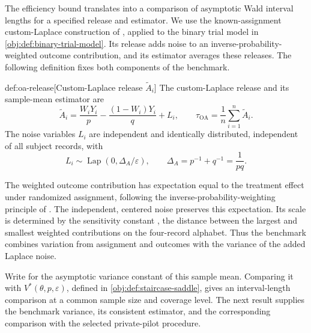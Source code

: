 \documentclass[11pt]{article}
\begin{document}
The efficiency bound translates into a comparison of asymptotic Wald interval lengths for a specified release and estimator. We use the known-assignment custom-Laplace construction of \citet{OhnishiAwan2025}, applied to the binary trial model in \cref{obj:def:binary-trial-model}. Its release  adds noise to an inverse-probability-weighted outcome contribution, and its estimator  averages these releases. The following definition fixes both components of the benchmark.

\begin{definitionv}{def:oa-release}[Custom-Laplace release $\widetilde A_i$]
The custom-Laplace release and its sample-mean estimator are
\[
\widetilde A_i
=
\frac{W_iY_i}{p}
-
\frac{(1-W_i)Y_i}{q}
+
L_i,
\qquad
\widehat\tau_{\mathrm{OA}}
=
\frac{1}{n}\sum_{i=1}^{n}\widetilde A_i.
\]
The noise variables \(L_i\) are independent and identically distributed, independent of all subject records, with
\[
L_i\sim\operatorname{Lap}(0,\Delta_A/\varepsilon),
\qquad
\Delta_A=p^{-1}+q^{-1}=\frac{1}{pq}.
\]
\end{definitionv}

The weighted outcome contribution has expectation equal to the treatment effect under randomized assignment, following the inverse-probability-weighting principle of \citet{Horvitz1952}. The independent, centered noise  preserves this expectation. Its scale is determined by the sensitivity constant , the distance between the largest and smallest weighted contributions on the four-record alphabet. Thus the benchmark combines variation from assignment and outcomes with the variance of the added Laplace noise.

Write  for the asymptotic variance constant of this sample mean. Comparing it with \(V^*(\theta,p,\varepsilon)\), defined in \cref{obj:def:staircase-saddle}, gives an interval-length comparison at a common sample size and coverage level. The next result supplies the benchmark variance, its consistent estimator, and the corresponding comparison with the selected private-pilot procedure.
\end{document}
